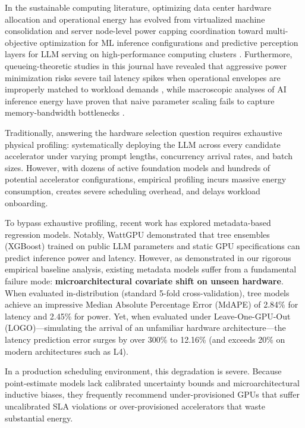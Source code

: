 \documentclass[preprint,12pt]{elsarticle}
\begin{document}
In the sustainable computing literature, optimizing data center hardware allocation and operational energy has evolved from virtualized machine consolidation \citep{suscom_malekloo2018, suscom_kumar2022} and server node-level power capping coordination \citep{suscom_powercoord2020} toward multi-objective optimization for ML inference configurations \citep{suscom_multiobj2026} and predictive perception layers for LLM serving on high-performance computing clusters \citep{suscom_forecasting2026}. Furthermore, queueing-theoretic studies in this journal have revealed that aggressive power minimization risks severe tail latency spikes when operational envelopes are improperly matched to workload demands \citep{suscom_tradeoffs2025}, while macroscopic analyses of AI inference energy have proven that naive parameter scaling fails to capture memory-bandwidth bottlenecks \citep{suscom_desislavov2023}.

Traditionally, answering the hardware selection question requires exhaustive physical profiling: systematically deploying the LLM across every candidate accelerator under varying prompt lengths, concurrency arrival rates, and batch sizes. However, with dozens of active foundation models and hundreds of potential accelerator configurations, empirical profiling incurs massive energy consumption, creates severe scheduling overhead, and delays workload onboarding.

To bypass exhaustive profiling, recent work has explored metadata-based regression models. Notably, WattGPU \citep{fadel2026wattgpu} demonstrated that tree ensembles (XGBoost) trained on public LLM parameters and static GPU specifications can predict inference power and latency. However, as demonstrated in our rigorous empirical baseline analysis, existing metadata models suffer from a fundamental failure mode: \textbf{microarchitectural covariate shift on unseen hardware}. When evaluated in-distribution (standard 5-fold cross-validation), tree models achieve an impressive Median Absolute Percentage Error (MdAPE) of 2.84\% for latency and 2.45\% for power. Yet, when evaluated under Leave-One-GPU-Out (LOGO)---simulating the arrival of an unfamiliar hardware architecture---the latency prediction error surges by over 300\% to 12.16\% (and exceeds 20\% on modern architectures such as L4).

In a production scheduling environment, this degradation is severe. Because point-estimate models lack calibrated uncertainty bounds and microarchitectural inductive biases, they frequently recommend under-provisioned GPUs that suffer uncalibrated SLA violations or over-provisioned accelerators that waste substantial energy.
\end{document}
